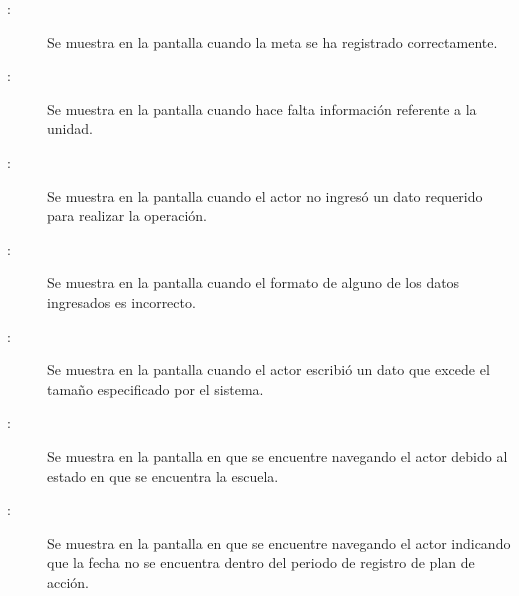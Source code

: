 \begin{description}
	\item[:] Se muestra en la pantalla  cuando la meta se ha registrado correctamente.
	\item[:] Se muestra en la pantalla  cuando hace falta información referente a la unidad.
	\item[:] Se muestra en la pantalla  cuando el actor no ingresó un dato requerido para realizar la operación.
	\item[:] Se muestra en la pantalla  cuando el formato de alguno de los datos ingresados es incorrecto.
	\item[:] Se muestra en la pantalla  cuando el actor escribió un dato que excede el tamaño especificado por el sistema.
	\item[:] Se muestra en la pantalla en que se encuentre navegando el actor debido al estado en que se encuentra la escuela.	
	\item[:] Se muestra en la pantalla en que se encuentre navegando el actor indicando que la fecha no se encuentra dentro del periodo de registro de plan de acción.
\end{description}
